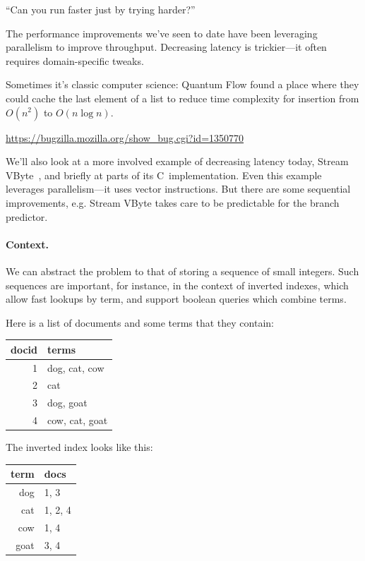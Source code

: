 \documentclass[a4paper]{report}
\newcommand{\CPP}{C\nolinebreak\hspace{-.05em}\raisebox{.4ex}{\tiny\bf +}\nolinebreak\hspace{-.10em}\raisebox{.4ex}{\tiny\bf +}}
\def\CPP{{C\nolinebreak[4]\hspace{-.05em}\raisebox{.4ex}{\tiny\bf ++}}}
\begin{document}
\hfill ``Can you run faster just by trying harder?''

The performance improvements we've seen to date have been leveraging parallelism
to improve throughput. Decreasing latency is trickier---it often requires domain-specific
tweaks.

Sometimes it's classic computer science: Quantum Flow found a place
where they could cache the last element of a list to reduce time
complexity for insertion from $O(n^2)$ to $O(n \log n)$.

\begin{center}
\url{https://bugzilla.mozilla.org/show_bug.cgi?id=1350770}
\end{center}

We'll also look at a more involved example of decreasing latency today, Stream VByte~\cite{LEMIRE20181}, and briefly at parts of its \CPP~implementation.
Even this example leverages parallelism---it uses vector instructions. But there
are some sequential improvements, e.g. Stream VByte takes care to be predictable
for the branch predictor.

\paragraph{Context.} We can abstract the problem to that of storing a sequence of small integers.
Such sequences are important, for instance, in the context of inverted indexes, which allow
fast lookups by term, and support boolean queries which combine terms.

Here is a list of documents and some terms that they contain:
\begin{center}
\begin{tabular}{r|l}
docid & terms \\ \hline
1 & dog, cat, cow\\
2 & cat\\
3 & dog, goat\\
4 & cow, cat, goat\\
\end{tabular}
\end{center}

The inverted index looks like this:
\begin{center}
\begin{tabular}{r|l}
term & docs \\ \hline
dog & 1, 3 \\
cat & 1, 2, 4 \\
cow & 1, 4 \\
goat & 3, 4
\end{tabular}
\end{center}
\end{document}

